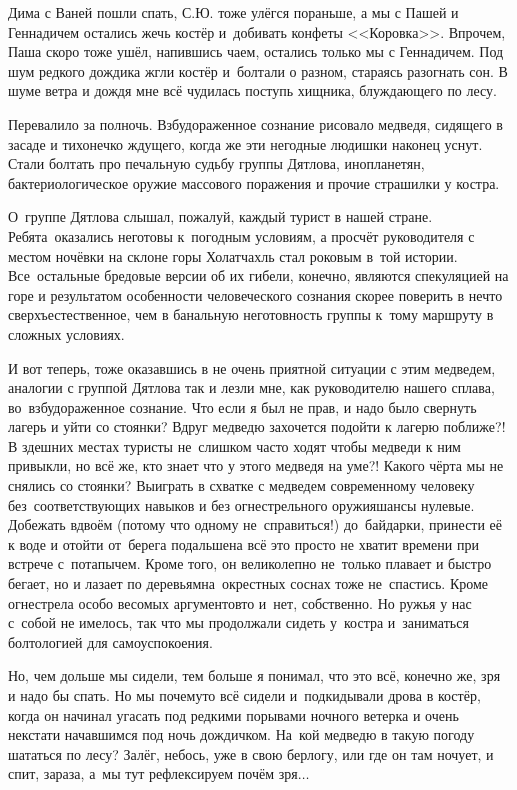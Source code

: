 \newpage
Дима с Ваней пошли спать, С.Ю. тоже улёгся пораньше, а мы с Пашей и Геннадичем остались жечь костёр и~добивать конфеты <<Коровка>>. Впрочем, Паша скоро тоже ушёл, напившись чаем, остались только мы с Геннадичем. Под шум редкого дождика жгли костёр и~болтали о разном, стараясь разогнать сон. В шуме ветра и дождя мне всё чудилась поступь хищника, блуждающего по лесу. 

Перевалило за полночь. Взбудораженное сознание рисовало медведя, сидящего в засаде и тихонечко ждущего, когда же эти негодные людишки наконец уснут. Стали болтать про печальную судьбу группы Дятлова, инопланетян, бактериологическое оружие массового поражения и прочие страшилки у костра. 

О~группе Дятлова слышал, пожалуй, каждый турист в нашей стране. Ребята~оказались неготовы к~погодным условиям, а просчёт руководителя с местом ночёвки на склоне горы Холатчахль стал роковым в~той истории. Все~остальные бредовые версии об их гибели, конечно, являются спекуляцией на горе и результатом особенности человеческого сознания скорее поверить в нечто сверхъестественное, чем в банальную неготовность группы к~тому маршруту в сложных условиях. 

И вот теперь, тоже оказавшись в не очень приятной ситуации с этим медведем, аналогии с группой Дятлова так и лезли мне, как руководителю нашего сплава, во~взбудораженное сознание. Что если я был не прав, и надо было свернуть лагерь и уйти со стоянки? Вдруг медведю захочется подойти к лагерю поближе?! В здешних местах туристы не~слишком часто ходят чтобы медведи к ним привыкли, но всё же, кто знает что у этого медведя на уме?! Какого чёрта мы не снялись со стоянки? Выиграть в схватке с медведем современному человеку без~соответствующих навыков и без огнестрельного оружия\mdash шансы нулевые. Добежать вдвоём (потому что одному не~справиться!) до~байдарки, принести её к воде и отойти от~берега подальше\mdash на всё это просто не хватит времени при встрече с~потапычем. Кроме того, он великолепно не~только плавает и быстро бегает, но и лазает по деревьям\mdash на~окрестных соснах тоже не~спастись. Кроме огнестрела особо весомых аргументов\sdash то и~нет, собственно. Но ружья у нас с~собой не имелось, так что мы продолжали сидеть у~костра и~заниматься болтологией для самоуспокоения.

Но, чем дольше мы сидели, тем больше я понимал, что это всё, конечно же, зря и надо бы спать. Но мы почему\sdash то всё сидели и~подкидывали дрова в костёр, когда он начинал угасать под редкими порывами ночного ветерка и очень некстати начавшимся под ночь дождичком. На~кой медведю в такую погоду шататься по лесу? Залёг, небось, уже в свою берлогу, или где он там ночует, и спит, зараза, а~мы тут рефлексируем почём зря$\ldots$ 

